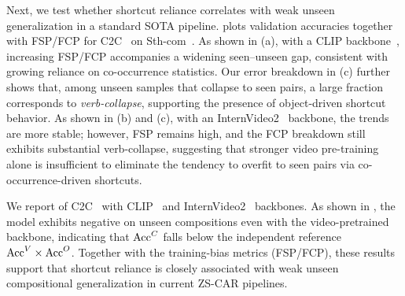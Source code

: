 Next, we test whether shortcut reliance correlates with weak unseen generalization in a standard SOTA pipeline.
 plots validation accuracies together with FSP/FCP for C2C~\cite{li2024c2c} on Sth-com~\cite{li2024c2c}.
As shown in  (a), with a CLIP backbone~\cite{radford2021clip}, increasing FSP/FCP accompanies a widening seen--unseen gap, consistent with growing reliance on co-occurrence statistics.
Our error breakdown in  (c) further shows that, among unseen samples that collapse to seen pairs, a large fraction corresponds to \emph{verb-collapse}, supporting the presence of object-driven shortcut behavior.
As shown in  (b) and (c), with an InternVideo2~\cite{wang2024iv2} backbone, the trends are more stable; however, FSP remains high, and the FCP breakdown still exhibits substantial verb-collapse, suggesting that stronger video pre-training alone is insufficient to eliminate the tendency to overfit to seen pairs via co-occurrence-driven shortcuts.





We report \cg{} of C2C~\cite{li2024c2c} with CLIP~\cite{radford2021clip} and InternVideo2~\cite{wang2024iv2} backbones.
As shown in , the model exhibits negative \cg{} on unseen compositions even with the video-pretrained backbone, indicating that $\mathrm{Acc}^{C}$ falls below the independent reference $\mathrm{Acc}^{V}\times\mathrm{Acc}^{O}$.
Together with the training-bias metrics (FSP/FCP), these results support that shortcut reliance is closely associated with weak unseen compositional generalization in current ZS-CAR pipelines.

